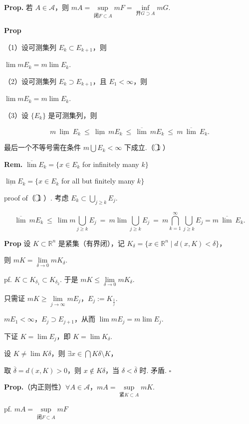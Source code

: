 \documentclass[11pt]{ctexart}
\theoremstyle{definition}
\begin{document}
\textbf{Prop.} 若 $A \in \mathscr{A}$，则 $mA = \sup\limits_{\text{闭} F \subset A} mF = \inf\limits_{\text{开} G \supset A} mG$.

\textbf{Prop}

（1）设可测集列 $E_k \subset E_{k+1}$，则

$\lim mE_k = m \lim E_k$.

（2）设可测集列 $E_k \supset E_{k+1}$，且 $E_1 < \infty$，则

$\lim mE_k = m \lim E_k$.

（3）设 $\{E_k\}$ 是可测集列，则

\[
m\ \underline{\lim}\ E_k \ \leq\ \underline{\lim}\ mE_k \ \leq\ \overline{\lim}\ mE_k \ \leq\ m\ \overline{\lim}\ E_k.
\]

最后一个不等号需在条件 $m \bigcup E_k < \infty$ 下成立.（ \textcircled{1} ）

\textbf{Rem.} $\overline{\lim} E_k = \{x \in E_k$ for infinitely many $k\}$

$\underline{\lim} E_k = \{x \in E_k$ for all but finitely many $k\}$

proof of（ \textcircled{1} ）. 考虑 $E_k \subset \bigcup_{j \geq k} E_j$.

\[
\overline{\lim}\ m E_k \ \leq\ \lim m \bigcup_{j \geq k} E_j \ =\ m \lim \bigcup_{j \geq k} E_j \ =\ m \bigcap_{k=1}^{\infty} \bigcup_{j \geq k} E_j = m\ \overline{\lim}\ E_k.
\]

\textbf{Prop} 设 $K \subset \mathbb{R}^n$ 是紧集（有界闭），记 $K_\delta = \{x \in \mathbb{R}^n \mid d(x, K) < \delta\}$，

则 $mK = \lim\limits_{\delta \to 0} mK_\delta$.

pf. $K \subset K_{\delta_1} \subset K_{\delta_2}$. 于是 $mK \leq \lim\limits_{\delta \to 0} mK_\delta$.

只需证 $mK \geq \lim\limits_{j \to \infty} mE_j$，$E_j := K_{\frac{1}{j}}$.

$mE_1 < \infty$，$E_j \supset E_{j+1}$，从而 $\lim mE_j = m \lim E_j$.

下证 $K = \lim E_j$，即 $K = \lim K_\delta$.

设 $K \neq \lim K\delta$，则 $\exists x \in \bigcap K\delta \setminus K$，

取 $\overline{\delta} = d(x, K) > 0$，则 $x \notin K\delta$，当 $\delta < \overline{\delta}$ 时. 矛盾. $\square$

\textbf{Prop.}（内正则性）$\forall A \in \mathscr{A}$，$mA = \sup\limits_{\text{紧} K \subset A} mK$.

pf. $mA = \sup\limits_{\text{闭} F \subset A} mF$
\end{document}
